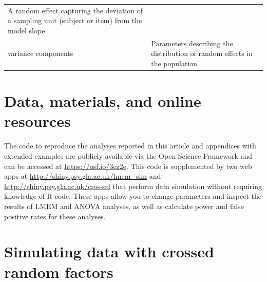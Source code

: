 \documentclass[english,doc,floatsintext]{apa6}
\begin{document}
\begin{tcolorbox}[colback=black!5!white,colframe=white!5!black,title=Box 1. Glossary of terms]
\begin{longtable}[]{@{}ll@{}}
\begin{minipage}[t]{0.65\columnwidth}
A random effect capturing the deviation of a sampling unit (subject or item) from the model slope\strut
\end{minipage}\tabularnewline
\begin{minipage}[t]{0.29\columnwidth}\raggedright
variance components\strut
\end{minipage} & \begin{minipage}[t]{0.65\columnwidth}\raggedright
Parameters describing the distribution of random effects in the
population\strut
\end{minipage}\tabularnewline
\end{longtable}
\end{tcolorbox}

\hypertarget{data-materials-and-online-resources}{%
\section{Data, materials, and online resources}\label{data-materials-and-online-resources}}

The code to reproduce the analyses reported in this article and appendices with extended examples are publicly available via the Open Science Framework and can be accessed at \url{https://osf.io/3cz2e}. This code is supplemented by two web apps at \url{http://shiny.psy.gla.ac.uk/lmem_sim} and \url{http://shiny.psy.gla.ac.uk/crossed} that perform data simulation without requiring knowledge of R code. These apps allow you to change parameters and inspect the results of LMEM and ANOVA analyses, as well as calculate power and false positive rates for these analyses.

\hypertarget{simulating-data-with-crossed-random-factors}{%
\section{Simulating data with crossed random factors}\label{simulating-data-with-crossed-random-factors}}
\end{document}
